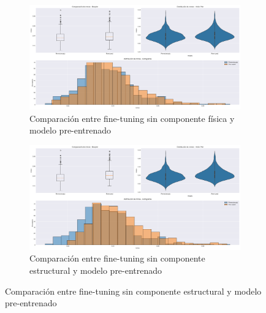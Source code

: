 \begin{figure}[H]
    \centering
    \begin{subfigure}[b]{0.48\textwidth}
        \centering
        \includegraphics[width=\textwidth]{Images/comparison_plots_nrmse_no_phy.png}
        \caption{Comparación entre fine-tuning sin componente física y modelo pre-entrenado}
        \label{fig:nrmse_hist}
    \end{subfigure}
    \hfill
    \begin{subfigure}[b]{0.48\textwidth}
        \centering
        \includegraphics[width=\textwidth]{Images/comparison_plots_nrmse_no_struct.png}
        \caption{Comparación entre fine-tuning sin componente estructural y modelo pre-entrenado}
        \label{fig:nrmse_violin}
    \end{subfigure}
    
    \vspace{0.5cm}
    

\end{figure}
